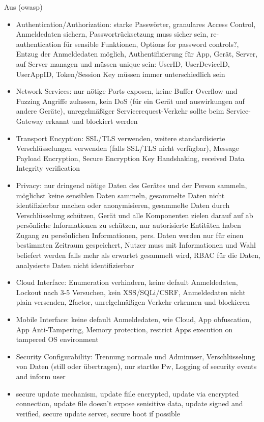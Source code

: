     Aus \cite{Miessler2015}(\gls{owasp})
    \begin{itemize}[noitemsep]
        \item Authentication/\-Authorization: starke Passwörter, granulares Access Control, Anmeldedaten sichern, Passwortrücksetzung muss sicher sein, re-authentication für sensible Funktionen, Options for password controls?, Entzug der Anmeldedaten möglich, Authentifizierung für App, Gerät, Server, auf Server managen und müssen unique sein: UserID, UserDeviceID, UserAppID, Token/\-Session Key müssen immer unterschiedlich sein
        \item Network Services: nur nötige Ports exposen, keine Buffer Overflow und Fuzzing Angriffe zulassen, kein DoS (für ein Gerät und auswirkungen auf andere Geräte), unregelmäßiger Servicerequest-Verkehr sollte beim Service-Gateway erkannt und blockiert werden
        \item Transport Encyption: SSL/\-TLS verwenden, weitere standardisierte Verschlüsselungen verwenden (falls SSL/\-TLS nicht verfügbar), Message Payload Encryption, Secure Encryption Key Handshaking, received Data Integrity verification
        \item Privacy: nur dringend nötige Daten des Gerätes und der Person sammeln, möglichst keine sensiblen Daten sammeln, gesammelte Daten nicht identifizierbar machen oder anonymisieren, gesammelte Daten durch Verschlüsselung schützen, Gerät und alle Komponenten zielen darauf auf ab persönliche Informationen zu schützen, nur autorisierte Entitäten haben Zugang zu persönlichen Informationen, pers. Daten werden nur für einen bestimmten Zeitraum gespeichert, Nutzer muss mit Informationen und Wahl beliefert werden falls mehr als erwartet gesammelt wird, RBAC für die Daten, analysierte Daten nicht identifizierbar
        \item Cloud Interface: Enumeration verhindern, keine default Anmeldedaten, Lockout nach 3-5 Versuchen, kein XSS/\-SQLi/\-CSRF, Anmeldedaten nicht plain versenden, 2factor, unrelgelmäßigen Verkehr erkennen und blockieren
        \item Mobile Interface: keine default Anmeldedaten, wie Cloud, App obfuscation, App Anti-Tampering, Memory protection, restrict Apps execution on tampered OS environment
        \item Security Configurability: Trennung normale und Adminuser, Verschlüsselung von Daten (still oder übertragen), nur startke Pw, Logging of security events and inform user
        \item secure update mechanism, update fiile encrypted, update via encrypted connection, update file doesn't expose senisitive data, update signed and verified, secure update server, secure boot if possible
    \end{itemize}